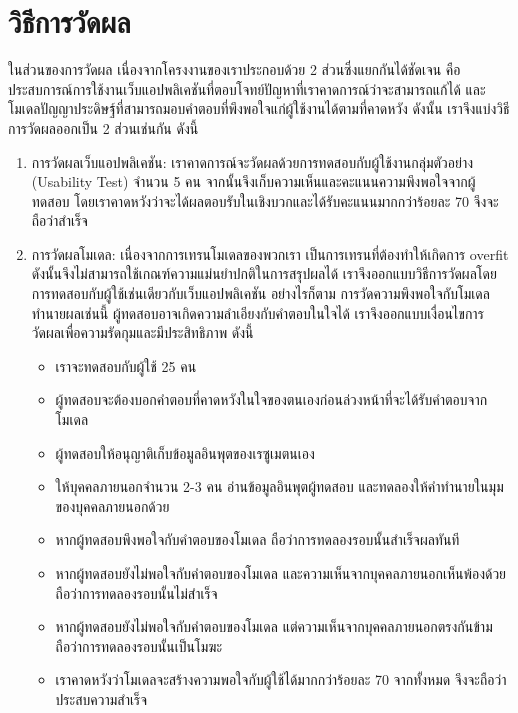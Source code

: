 
\section{วิธีการวัดผล}
ในส่วนของการวัดผล เนื่องจากโครงงานของเราประกอบด้วย 2 ส่วนซึ่งแยกกันได้ชัดเจน คือ ประสบการณ์การใช้งานเว็บแอปพลิเคชันที่ตอบโจทย์ปัญหาที่เราคาดการณ์ว่าจะสามารถแก้ได้
และโมเดลปัญญาประดิษฐ์ที่สามารถมอบคำตอบที่พึงพอใจแก่ผู้ใช้งานได้ตามที่คาดหวัง ดังนั้น เราจึงแบ่งวิธีการวัดผลออกเป็น 2 ส่วนเช่นกัน ดังนี้

\begin{enumerate}
    \item การวัดผลเว็บแอปพลิเคชัน: เราคาดการณ์จะวัดผลด้วยการทดสอบกับผู้ใช้งานกลุ่มตัวอย่าง (Usability Test) จำนวน 5 คน จากนั้นจึงเก็บความเห็นและคะแนนความพึงพอใจจากผู้ทดสอบ
    โดยเราคาดหวังว่าจะได้ผลตอบรับในเชิงบวกและได้รับคะแนนมากกว่าร้อยละ 70 จึงจะถือว่าสำเร็จ
    \item การวัดผลโมเดล: เนื่องจากการเทรนโมเดลของพวกเรา เป็นการเทรนที่ต้องทำให้เกิดการ overfit ดังนั้นจึงไม่สามารถใช้เกณฑ์ความแม่นยำปกติในการสรุปผลได้ 
    เราจึงออกแบบวิธีการวัดผลโดยการทดสอบกับผู้ใช้เช่นเดียวกับเว็บแอปพลิเคชัน อย่างไรก็ตาม การวัดความพึงพอใจกับโมเดลทำนายผลเช่นนี้ 
    ผู้ทดสอบอาจเกิดความลำเอียงกับคำตอบในใจได้ เราจึงออกแบบเงื่อนไขการวัดผลเพื่อความรัดกุมและมีประสิทธิภาพ ดังนี้
    \begin{itemize}
        \item เราจะทดสอบกับผู้ใช้ 25 คน
        \item ผู้ทดสอบจะต้องบอกคำตอบที่คาดหวังในใจของตนเองก่อนล่วงหน้าที่จะได้รับคำตอบจากโมเดล
        \item ผู้ทดสอบให้อนุญาติเก็บข้อมูลอินพุตของเรซูเมตนเอง
        \item ให้บุคคลภายนอกจำนวน 2-3 คน อ่านข้อมูลอินพุตผู้ทดสอบ และทดลองให้คำทำนายในมุมของบุคคลภายนอกด้วย
        \item หากผู้ทดสอบพึงพอใจกับคำตอบของโมเดล ถือว่าการทดลองรอบนั้นสำเร็จผลทันที
        \item หากผู้ทดสอบยังไม่พอใจกับคำตอบของโมเดล และความเห็นจากบุคคลภายนอกเห็นพ้องด้วย ถือว่าการทดลองรอบนั้นไม่สำเร็จ
        \item หากผู้ทดสอบยังไม่พอใจกับคำตอบของโมเดล แต่ความเห็นจากบุคคลภายนอกตรงกันข้าม ถือว่าการทดลองรอบนั้นเป็นโมฆะ
        \item เราคาดหวังว่าโมเดลจะสร้างความพอใจกับผู้ใช้ได้มากกว่าร้อยละ 70 จากทั้งหมด จึงจะถือว่าประสบความสำเร็จ
    \end{itemize}
\end{enumerate}


